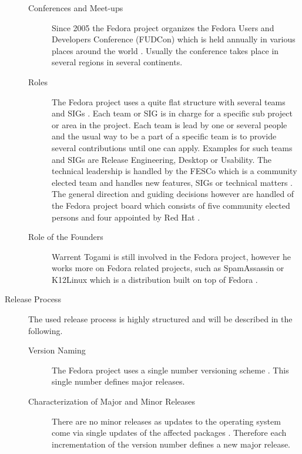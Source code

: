 \begin{description}
\begin{description}
    \item[Conferences and Meet-ups] Since 2005 the Fedora project organizes the
      Fedora Users and Developers Conference (FUDCon) which is held annually in
      various places around the world \cite{FedoraFUDCon}. Usually the
      conference takes place in several regions in several continents.

    \item[Roles] The Fedora project uses a quite flat structure with several
      teams and \acp{SIG} \cite{FedoraJoin,FedoraCommunicating,FedoraSIG}. Each
      team or \ac{SIG} is in charge for a specific sub project or area in the
      project. Each team is lead by one or several people and the usual way to
      be a part of a specific team is to provide several contributions until
      one can apply. Examples for such teams and \acp{SIG} are Release
      Engineering, Desktop or Usability. The technical leadership is handled by
      the \ac{FESCo} which is a community elected team and handles new
      features, \acp{SIG} or technical matters \cite{FedoraFESCo}. The general
      direction and guiding decisions however are handled of the Fedora project
      board which consists of five community elected persons and four appointed
      by Red Hat \cite{FedoraBoard}.

    \item[Role of the Founders] Warrent Togami is still involved in the Fedora
      project, however he works more on Fedora related projects, such as
      SpamAssassin or K12Linux which is a distribution built on top of Fedora
      \cite{FedoraTogami}.

  \end{description}

  \item[Release Process] The used release process is highly structured and will
    be described in the following.

  \begin{description}

    \item[Version Naming] The Fedora project uses a single number versioning
      scheme \cite{FedoraHistoricalSchedules,FedoraLifeCycle}. This single
      number defines major releases.

    \item[Characterization of Major and Minor Releases] There are no minor
      releases as updates to the operating system come via single updates of
      the affected packages \cite{FedoraHistoricalSchedules,FedoraLifeCycle}.
      Therefore each incrementation of the version number defines a new major
      release.


\end{description}
\end{description}

